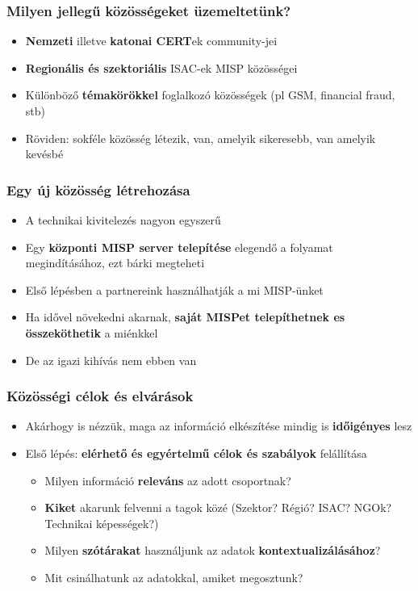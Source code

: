 \begin{frame}
  \frametitle{Milyen jellegű közösségeket üzemeltetünk?}
  \begin{itemize}
    \item {\bf Nemzeti} illetve {\bf katonai CERT}ek community-jei
    \item {\bf Regionális és szektoriális} ISAC-ek MISP közösségei
    \item Különböző {\bf témakörökkel} foglalkozó közösségek (pl GSM, financial fraud, stb)
    \item Röviden: sokféle közösség létezik, van, amelyik sikeresebb, van amelyik kevésbé
  \end{itemize}
\end{frame}

\begin{frame}
  \frametitle{Egy új közösség létrehozása}
  \begin{itemize}
      \item A technikai kivitelezés nagyon egyszerű
      \item Egy {\bf központi MISP server telepítése} elegendő a folyamat megindításához, ezt bárki megteheti
      \item Első lépésben a partnereink használhatják a mi MISP-ünket
      \item Ha idővel növekedni akarnak, {\bf saját MISPet telepíthetnek es összeköthetik} a miénkkel
      \item De az igazi kihívás nem ebben van
  \end{itemize}
\end{frame}

\begin{frame}
  \frametitle{Közösségi célok és elvárások}
  \begin{itemize}
      \item Akárhogy is nézzük, maga az információ elkészítése mindig is {\bf időigényes} lesz
      \item Első lépés: {\bf elérhető és egyértelmű célok és szabályok} felállítása
      \begin{itemize}
          \item Milyen információ {\bf releváns} az adott csoportnak?
          \item {\bf Kiket} akarunk felvenni a tagok közé (Szektor? Régió? ISAC? NGOk? Technikai képességek?)
          \item Milyen {\bf szótárakat} használjunk az adatok {\bf kontextualizálásához}?
          \item Mit csinálhatunk az adatokkal, amiket megosztunk?
      \end{itemize}
  \end{itemize}
\end{frame}

